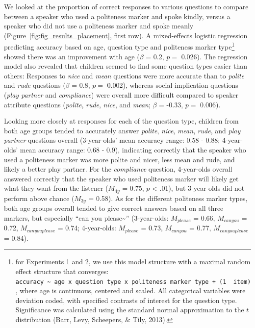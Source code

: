 \documentclass[10pt, letterpaper]{article}
\begin{document}
We looked at the proportion of correct responses to various questions to
compare between a speaker who used a politeness marker and spoke kindly,
versus a speaker who did not use a politeness marker and spoke meanly
(Figure~\ref{fig:fig_results_placement}, first row). A mixed-effects
logistic regression predicting accuracy based on age, question type and
politeness marker type\footnote{for Experiments 1 and 2, we use this
  model structure with a maximal random effect structure that converges:
  \texttt{accuracy\ \textasciitilde{}\ age\ x\ question\ type\ x\ politeness\ marker\ type\ +\ (1\ \textbar{}\ item)},
  where age is continuous, centered and scaled. All categorical
  variables were deviation coded, with specified contrasts of interest
  for the question type. Significance was calculated using the standard
  normal approximation to the \(t\) distribution (Barr, Levy, Scheepers,
  \& Tily, 2013).} showed there was an improvement with age (\(\beta\) =
0.2, \(p =\) 0.026). The regression model also revealed that children
seemed to find some question types easier than others: Responses to
\emph{nice} and \emph{mean} questions were more accurate than to
\emph{polite} and \emph{rude} questions (\(\beta\) = 0.8, \(p =\)
0.002), whereas social implication questions (\emph{play partner} and
\emph{compliance}) were overall more difficult compared to speaker
attribute questions (\emph{polite}, \emph{rude}, \emph{nice}, and
\emph{mean}; \(\beta\) = -0.33, \(p =\) 0.006).

Looking more closely at responses for each of the question type,
children from both age groups tended to accurately answer \emph{polite},
\emph{nice}, \emph{mean}, \emph{rude}, and \emph{play partner} questions
overall (3-year-olds' mean accuracy range: 0.58 - 0.88; 4-year-olds'
mean accuracy range: 0.68 - 0.9), indicating correctly that the speaker
who used a politeness marker was more polite and nicer, less mean and
rude, and likely a better play partner. For the \emph{compliance}
question, 4-year-olds overall answered correctly that the speaker who
used politeness marker will likely get what they want from the listener
(\(M_{4y}\) = 0.75, \(p\) \textless{} .01), but 3-year-olds did not
perform above chance (\(M_{3y}\) = 0.58). As for the different
politeness marker types, both age groups overall tended to give correct
answers based on all three markers, but especially ``can you
please\textasciitilde{}'' (3-year-olds: \(M_{please}\) = 0.66,
\(M_{can you}\) = 0.72, \(M_{can you please}\) = 0.74; 4-year-olds:
\(M_{please}\) = 0.73, \(M_{can you}\) = 0.77, \(M_{can you please}\) =
0.84).
\end{document}
